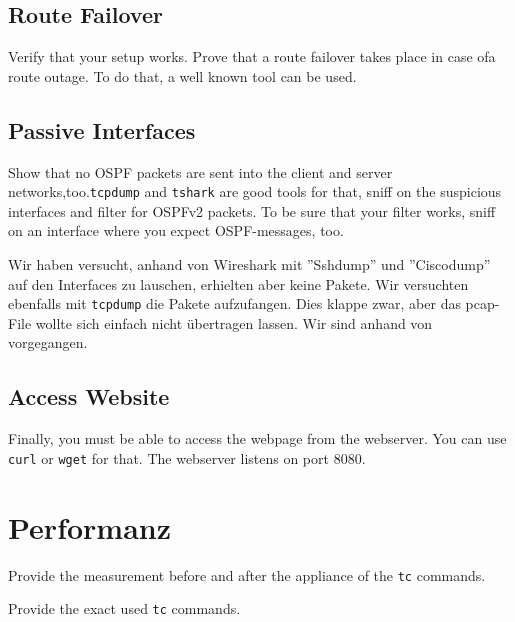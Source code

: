 \documentclass[11pt,titlepage]{article}
\newenvironment{shadedquotation}
 {\begin{shaded*}
  \quoting[leftmargin=0pt, vskip=0pt]
 }
 {\endquoting
 \end{shaded*}
}
\begin{document}
\subsection{Route Failover}
\label{subsec:RouteFailover}
\begin{shadedquotation}
  Verify that your setup works. Prove that a route failover takes place in case ofa route outage. To do that, a well known tool can be used.
\end{shadedquotation}

\subsection{Passive Interfaces}
\label{subsec:PassiveInterfaces}
\begin{shadedquotation}
  Show that no OSPF packets are sent into the client and server networks,too.\lstinline!tcpdump! and \lstinline!tshark! are good tools for that, sniff on the suspicious interfaces and filter for OSPFv2 packets. To be sure that your filter works, sniff on an interface where you expect OSPF-messages, too.
\end{shadedquotation}

Wir haben versucht, anhand von Wireshark mit ''Sshdump'' und ''Ciscodump'' auf den Interfaces zu lauschen, erhielten aber keine Pakete.
Wir versuchten ebenfalls mit \lstinline!tcpdump! die Pakete aufzufangen. Dies klappe zwar, aber das pcap-File wollte sich einfach nicht übertragen lassen. Wir sind anhand von \cite{TCPDUMP} vorgegangen.

\subsection{Access Website}
\label{subsec:AccessWebsite}
\begin{shadedquotation}
  Finally, you must be able to access the webpage from the webserver. You can use \lstinline!curl! or \lstinline!wget! for that. The webserver listens on port 8080.
\end{shadedquotation}

\section{Performanz}
\label{sec:Performanz}
\begin{shadedquotation}
  Provide the measurement before and after the appliance of the \lstinline!tc! commands.
  
  Provide the exact used \lstinline!tc! commands.
\end{shadedquotation}
\end{document}
